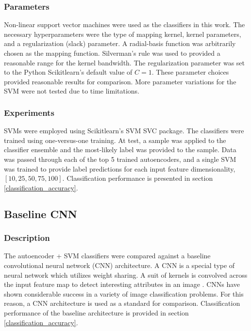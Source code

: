 \documentclass[conference]{IEEEtran}
\begin{document}
	 \subsubsection*{Parameters}
	 Non-linear support vector machines were used as the classifiers in this work. The necessary hyperparameters were the type of mapping kernel,  kernel parameters, and a regularization (slack) parameter.  A radial-basis function was arbitrarily chosen as the mapping function.  Silverman's rule was used to provided a reasonable range for the kernel bandwidth. The regularization parameter was set to the Python Scikitlearn's default value of $C=1$.  These parameter choices provided reasonable results for comparison.  More parameter variations for the SVM were not tested due to time limitations.
	 
	 \subsubsection*{Experiments}
	 SVMs were employed using Scikitlearn's SVM SVC package.  The classifiers were trained using one-versus-one training.  At test, a sample was applied to the classifier ensemble and the most-likely label was provided to the sample.  Data was passed through each of the top 5 trained autoencoders, and a single SVM was trained to provide label predictions for each input feature dimensionality, $[10,25,50,75,100]$.  Classification performance is presented in section \ref{classification_accuracy}. 
	 
	 
	 \subsection{Baseline CNN}
	 
	 \subsubsection*{Description}
	 The autoencoder + SVM classifiers were compared against a baseline convolutional neural network (CNN) architecture.  A CNN is a special type of neural network which utilizes weight sharing. A suit of kernels is convolved across the input feature map to detect interesting attributes in an image \cite{Goodfellow2016DeepLearning,Haykin2009NeuralNetworks}.  CNNs have shown considerable success in a variety of image classification problems.  For this reason, a CNN architecture is used as a standard for comparison.  Classification performance of the baseline architecture is provided in section \ref{classification_accuracy}.
	 
\end{document}
